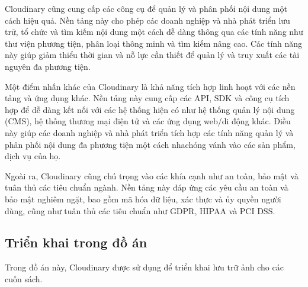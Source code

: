 \documentclass[../DoAn.tex]{subfiles}
\begin{document}
Cloudinary cũng cung cấp các công cụ để quản lý và phân phối nội dung một cách hiệu quả. Nền tảng này cho phép các doanh nghiệp và nhà phát triển lưu trữ, tổ chức và tìm kiếm nội dung một cách dễ dàng thông qua các tính năng như thư viện phương tiện, phân loại thông minh và tìm kiếm nâng cao. Các tính năng này giúp giảm thiểu thời gian và nỗ lực cần thiết để quản lý và truy xuất các tài nguyên đa phương tiện.

Một điểm nhấn khác của Cloudinary là khả năng tích hợp linh hoạt với các nền tảng và ứng dụng khác. Nền tảng này cung cấp các API, SDK và công cụ tích hợp để dễ dàng kết nối với các hệ thống hiện có như hệ thống quản lý nội dung (CMS), hệ thống thương mại điện tử và các ứng dụng web/di động khác. Điều này giúp các doanh nghiệp và nhà phát triển tích hợp các tính năng quản lý và phân phối nội dung đa phương tiện một cách nhachóng vánh vào các sản phẩm, dịch vụ của họ.

Ngoài ra, Cloudinary cũng chú trọng vào các khía cạnh như an toàn, bảo mật và tuân thủ các tiêu chuẩn ngành. Nền tảng này đáp ứng các yêu cầu an toàn và bảo mật nghiêm ngặt, bao gồm mã hóa dữ liệu, xác thực và ủy quyền người dùng, cũng như tuân thủ các tiêu chuẩn như GDPR, HIPAA và PCI DSS.

\subsection{Triển khai trong đồ án}
\label{subsection3.8.2}
Trong đồ án này, Cloudinary được sử dụng để triển khai lưu trữ ảnh cho các cuốn sách.
\end{document}

